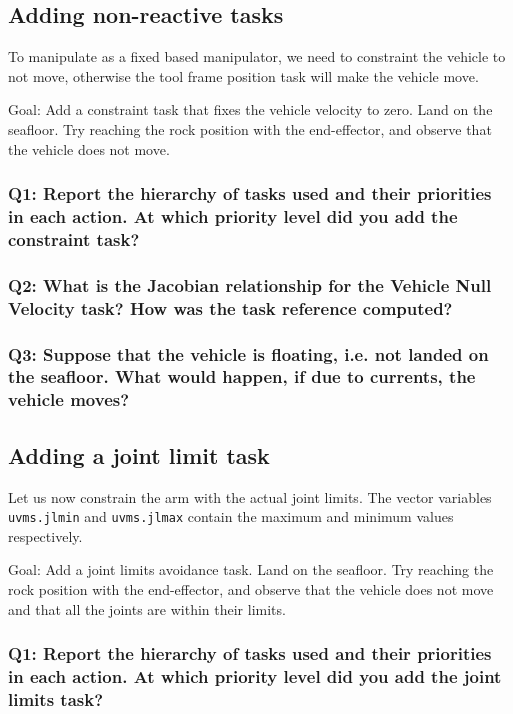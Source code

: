 \documentclass{article}
\begin{document}
\subsection{Adding non-reactive tasks}
To manipulate as a fixed based manipulator, we need to constraint the vehicle to not move, otherwise the tool frame position task will make the vehicle move.

Goal: Add a constraint task that fixes the vehicle velocity to zero. Land on the seafloor. Try reaching the rock position with the end-effector, and observe that the vehicle does not move.

\subsubsection{Q1: Report the hierarchy of tasks used and their priorities in each action. At which priority level did you add the constraint task?}

\subsubsection{Q2: What is the Jacobian relationship for the Vehicle Null Velocity task? How was the task reference computed?}

\subsubsection{Q3: Suppose that the vehicle is floating, i.e. not landed on the seafloor. What would happen, if due to currents, the vehicle moves?}


\subsection{Adding a joint limit task}
Let us now constrain the arm with the actual joint limits. The vector variables \texttt{uvms.jlmin} and \texttt{uvms.jlmax} contain the maximum and minimum values respectively.

Goal: Add a joint limits avoidance task. Land on the seafloor. Try reaching the rock position with the end-effector, and observe that the vehicle does not move and that all the joints are within their limits.

\subsubsection{Q1: Report the hierarchy of tasks used and their priorities in each action. At which priority level did you add the joint limits task?}
\end{document}
